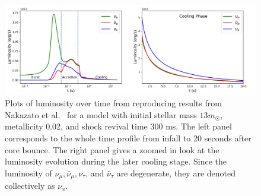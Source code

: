 \documentclass[a4paper,12pt]{article}
\begin{document}
\begin{figure}[t]
\begin{center}
\includegraphics[width=16cm]{flux_luminosity_evolution.png}
\caption{Plots of luminosity over time from reproducing results from Nakazato et al.\ \cite{Nakazato:2012qf} for a model with initial stellar mass $13m_{\odot}$, metallicity 0.02, and shock revival time 300 ms. The left panel corresponds to the whole time profile from infall to 20 seconds after core bounce. The right panel gives a zoomed in look at the luminosity evolution during the later cooling stage. Since the luminosity of $\nu_{\mu}, \bar{\nu}_{\mu}, \nu_{\tau}$, and $\bar{\nu}_{\tau}$ are degenerate, they are denoted collectively as $\nu_{x}$.}
\label{fig:flux_sim}
\end{center}
\end{figure}
\end{document}
